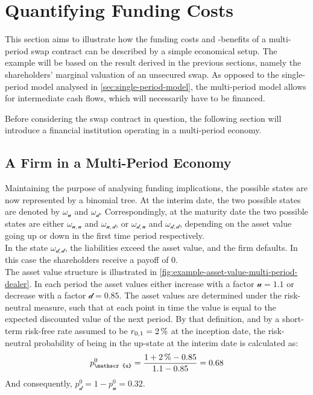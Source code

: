 \documentclass[main.tex]{subfiles}
\begin{document}
    \section{Quantifying Funding Costs}

        This section aims to illustrate
        how the funding costs and -benefits of a multi-period swap contract
        can be described by a simple economical setup.
        The example will be based on the result derived in the previous sections,
        namely the shareholders' marginal valuation of an unsecured swap.
        As opposed to the single-period model analysed in \cref{sec:single-period-model},
        the multi-period model allows for intermediate cash flows,
        which will necessarily have to be financed.

        Before considering the swap contract in question, 
        the following section will introduce a financial institution
        operating in a multi-period economy. 

    \subsection{A Firm in a Multi-Period Economy}
    \label{sec:swap-examples}
        
        Maintaining the purpose of analysing funding implications,
        the possible states are now represented by a binomial tree.
        At the interim date, the two possible states are denoted by $\omega_\mathscr{u}$ and $\omega_\mathscr{d}$.
        Correspondingly, at the maturity date the two possible states are either
        $\omega_{\mathscr{u},\mathscr{u}}$ and $\omega_{\mathscr{u},\mathscr{d}}$,
        or $\omega_{\mathscr{d},\mathscr{u}}$ and $\omega_{\mathscr{d},\mathscr{d}}$,
        depending on the asset value going up or down in the first time period respectively.
        \\
        In the state $\omega_{\mathscr{d},\mathscr{d}}$, the liabilities exceed the asset value,
        and the firm defaults.
        In this case the shareholders receive a payoff of 0.
        \\
        The asset value structure is illustrated in 
        \cref{fig:example-asset-value-multi-period-dealer}.
        In each period the asset values either increase with a factor $\mathscr{u} = \num{1.1}$
        or decrease with a factor $\mathscr{d} = \num{0.85}$.
        The asset values are determined under the risk-neutral measure,
        such that at each point in time the value is equal to the expected discounted value of the next period.
        By that definition, and by a short-term risk-free rate assumed to be $r_{0,1}=\pct{0.02}$ at the inception date,
        the risk-neutral probability of being in the up-state at the interim date is calculated as:
        \begin{equation*}
            p_{\mathscr{u}}^{0} =
            \frac{
                \num{1} + \pct{0.02} - \num{0.85}
            }{
                \num{1.1} - \num{0.85}
            }
            = \num{0.68}
        \end{equation*}
        And consequently, $p_{\mathscr{d}}^{0} = 1 - p_{\mathscr{u}}^{0} = \num{0.32}$.
\end{document}
